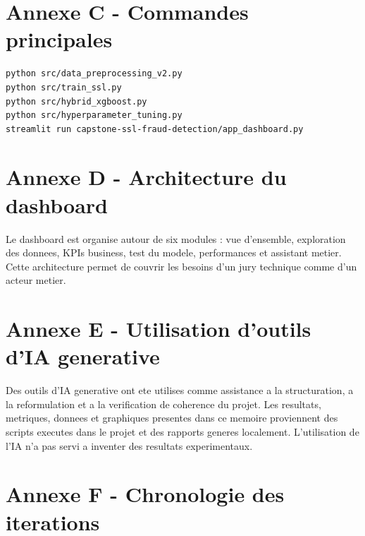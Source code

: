 \documentclass[12pt,a4paper]{report}
\begin{document}
\chapter{Annexe C - Commandes principales}

\begin{verbatim}
python src/data_preprocessing_v2.py
python src/train_ssl.py
python src/hybrid_xgboost.py
python src/hyperparameter_tuning.py
streamlit run capstone-ssl-fraud-detection/app_dashboard.py
\end{verbatim}

\chapter{Annexe D - Architecture du dashboard}

Le dashboard est organise autour de six modules : vue d'ensemble, exploration des donnees, KPIs business, test du modele, performances et assistant metier. Cette architecture permet de couvrir les besoins d'un jury technique comme d'un acteur metier.

\chapter{Annexe E - Utilisation d'outils d'IA generative}

Des outils d'IA generative ont ete utilises comme assistance a la structuration, a la reformulation et a la verification de coherence du projet. Les resultats, metriques, donnees et graphiques presentes dans ce memoire proviennent des scripts executes dans le projet et des rapports generes localement. L'utilisation de l'IA n'a pas servi a inventer des resultats experimentaux.

\chapter{Annexe F - Chronologie des iterations}
\end{document}

